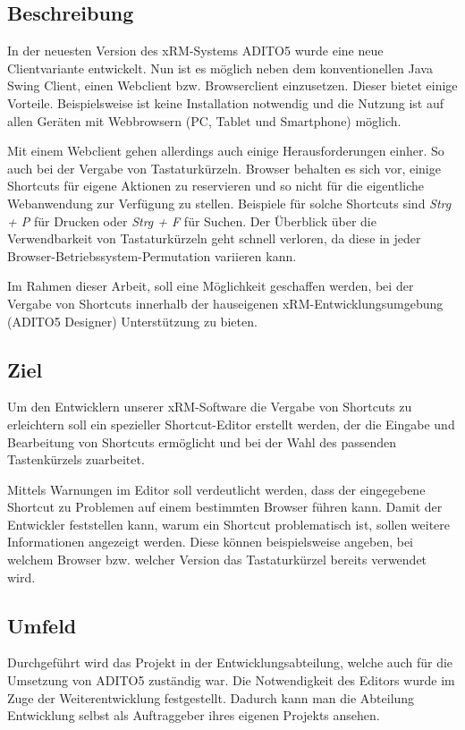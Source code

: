 \subsection{Beschreibung}
 
In der neuesten Version des xRM-Systems ADITO5 wurde eine neue Clientvariante entwickelt. Nun ist es möglich neben dem konventionellen Java Swing Client, einen Webclient bzw. Browserclient einzusetzen. Dieser bietet einige Vorteile. Beispielsweise ist keine Installation notwendig und die Nutzung ist auf allen Geräten mit Webbrowsern (PC, Tablet und Smartphone) möglich. 

Mit einem Webclient gehen allerdings auch einige Herausforderungen einher. So auch bei der Vergabe von Tastaturkürzeln. Browser behalten es sich vor, einige Shortcuts für eigene Aktionen zu reservieren und so nicht für die eigentliche Webanwendung zur Verfügung zu stellen. Beispiele für solche Shortcuts sind \emph{Strg + P} für Drucken oder \emph{Strg + F} für Suchen. Der Überblick über die Verwendbarkeit von Tastaturkürzeln geht schnell verloren, da diese in jeder Browser-Betriebssystem-Permutation variieren kann.

Im Rahmen dieser Arbeit, soll eine Möglichkeit geschaffen werden, bei der Vergabe von Shortcuts innerhalb der hauseigenen xRM-Entwicklungsumgebung (ADITO5 Designer) Unterstützung zu bieten.

\subsection{Ziel}

Um den Entwicklern unserer xRM-Software die Vergabe von Shortcuts zu erleichtern soll ein spezieller Shortcut-Editor erstellt werden, der die Eingabe und Bearbeitung von Shortcuts ermöglicht und bei der Wahl des passenden Tastenkürzels zuarbeitet.

Mittels Warnungen im Editor soll verdeutlicht werden, dass der eingegebene Shortcut zu Problemen auf einem bestimmten Browser führen kann. Damit der Entwickler feststellen kann, warum ein Shortcut problematisch ist, sollen weitere Informationen angezeigt werden. Diese können beispielsweise angeben, bei welchem Browser bzw. welcher Version das Tastaturkürzel bereits verwendet wird.

\subsection{Umfeld}

Durchgeführt wird das Projekt in der Entwicklungsabteilung, welche auch für die Umsetzung von ADITO5 zuständig war. Die Notwendigkeit des Editors wurde im Zuge der Weiterentwicklung festgestellt. Dadurch kann man die Abteilung Entwicklung selbst als Auftraggeber ihres eigenen Projekts ansehen.

